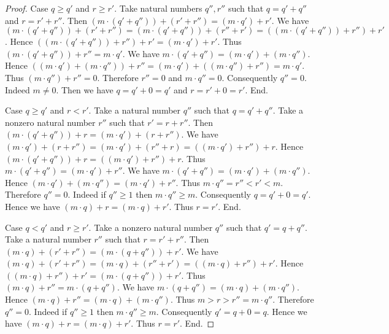 \documentclass[../../arithmetic.ftl.tex]{subfiles}
\begin{document}
\begin{forthel}
\begin{proof}
      Case $q \geq q'$ and $r \geq r'$.
        Take natural numbers $q'',r''$ such that $q = q' + q''$ and $r = r' + r''$.
        Then $(m \cdot (q' + q'')) + (r' + r'') = (m \cdot q') + r'$.
        We have $(m \cdot (q' + q'')) + (r' + r'') = (m \cdot (q' + q'')) + (r'' + r') = ((m \cdot (q' + q'')) + r'') + r'$.
        Hence $((m \cdot (q' + q'')) + r'') + r' = (m \cdot q') + r'$.
        Thus $(m \cdot (q' + q'')) + r'' = m \cdot q'$.
        We have $m \cdot (q' + q'') = (m \cdot q') + (m \cdot q'')$.
        Hence $((m \cdot q') + (m \cdot q'')) + r'' = (m \cdot q') + ((m \cdot q'') + r'') = m \cdot q'$.
        Thus $(m \cdot q'') + r'' = 0$.
        Therefore $r'' = 0$ and $m \cdot q'' = 0$.
        Consequently $q'' = 0$.
        Indeed $m \neq 0$.
        Then we have $q = q' + 0 = q'$  and $r = r' + 0 = r'$.
      End.

      Case $q \geq q'$ and $r < r'$.
        Take a natural number $q''$ such that $q = q' + q''$.
        Take a nonzero natural number $r''$ such that $r' = r + r''$.
        Then $(m \cdot (q' + q'')) + r = (m \cdot q') + (r + r'')$.
        We have $(m \cdot q') + (r + r'') = (m \cdot q') + (r'' + r) = ((m \cdot q') + r'') + r$.
        Hence $(m \cdot (q' + q'')) + r = ((m \cdot q') + r'') + r$.
        Thus $m \cdot (q' + q'') = (m \cdot q') + r''$.
        We have $m \cdot (q' + q'') = (m \cdot q') + (m \cdot q'')$.
        Hence $(m \cdot q') + (m \cdot q'') = (m \cdot q') + r''$.
        Thus $m \cdot q'' = r'' < r' < m$.
        Therefore $q'' = 0$.
        Indeed if $q'' \geq 1$ then $m \cdot q'' \geq m$.
        Consequently $q = q' + 0 = q'$.
        Hence we have $(m \cdot q) + r = (m \cdot q) + r'$.
        Thus $r = r'$.
      End.

      Case $q < q'$ and $r \geq r'$.
        Take a nonzero natural number $q''$ such that $q' = q + q''$.
        Take a natural number $r''$ such that $r = r' + r''$.
        Then $(m \cdot q) + (r' + r'') = (m \cdot (q + q'')) + r'$.
        We have $(m \cdot q) + (r' + r'') = (m \cdot q) + (r'' + r') = ((m \cdot q) + r'') + r'$.
        Hence $((m \cdot q) + r'') + r' = (m \cdot (q + q'')) + r'$.
        Thus $(m \cdot q) + r'' = m \cdot (q + q'')$.
        We have $m \cdot (q + q'') = (m \cdot q) + (m \cdot q'')$.
        Hence $(m \cdot q) + r'' = (m \cdot q) + (m \cdot q'')$.
        Thus $m > r > r'' = m \cdot q''$.
        Therefore $q'' = 0$.
        Indeed if $q'' \geq 1$ then $m \cdot q'' \geq m$.
        Consequently $q' = q + 0 = q$.
        Hence we have $(m \cdot q) + r = (m \cdot q) + r'$.
        Thus $r = r'$.
      End.


\end{proof}
\end{forthel}
\end{document}
